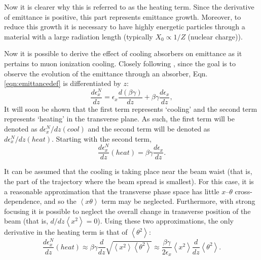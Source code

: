 Now it is clearer why this is referred to as the heating term. Since the derivative of emittance is positive, this part represents emittance growth. Moreover, to reduce this growth it is necessary to have highly energetic particles through a material with a large radiation length (typically $X_0 \propto 1/Z$ (nuclear charge)).

\iffalse




Now it is possible to derive the effect of cooling absorbers on emittance as it pertains to muon ionization cooling. Closely following \cite{Fernow}, since the goal is to observe the evolution of the emittance through an absorber, Eqn. \ref{eqn:emittancedef} is differentiated by $z$:
%
\begin{equation}
\label{eqn:emittance1}
\frac{d\epsilon_x^N}{dz}=\epsilon_x \frac{d(\beta\gamma)}{dz}+\beta\gamma\frac{d\epsilon_x}{dz},
\end{equation}
%
It will soon be shown that the first term represents `cooling' and the second term represents `heating' in the transverse plane. As such, the first term will be denoted as $d\epsilon_x^N/dz (cool)$ and the second term will be denoted as $d\epsilon_x^N/dz (heat)$. Starting with the second term,
%
\begin{equation} \nonumber
\frac{d\epsilon_x^N}{dz}(heat)=\beta\gamma\frac{d\epsilon_x}{dz}.
\end{equation}
%

It can be assumed that the cooling is taking place near the beam waist (that is, the part of the trajectory where the beam spread is smallest). For this case, it is a reasonable approximation that the transverse phase space has little $x$--$\theta$ cross-dependence, and so the $\left<x\theta\right>$ term may be neglected. Furthermore, with strong focusing it is possible to neglect the overall change in transverse position of the beam \cite{Fernow} (that is, $d/dz \left<x^2\right>=0$). Using these two approximations, the only derivative in the heating term is that of $\left<\theta^2\right>$:
\begin{equation} \nonumber
\frac{d\epsilon_x^N}{dz}(heat)\approx\beta\gamma\frac{d}{dz}\sqrt{\left<x^2\right>\left<\theta^2\right>}\approx \frac{\beta\gamma}{2\epsilon_x}\left<x^2\right>\frac{d}{dz}\left<\theta^2\right>.
\end{equation}

